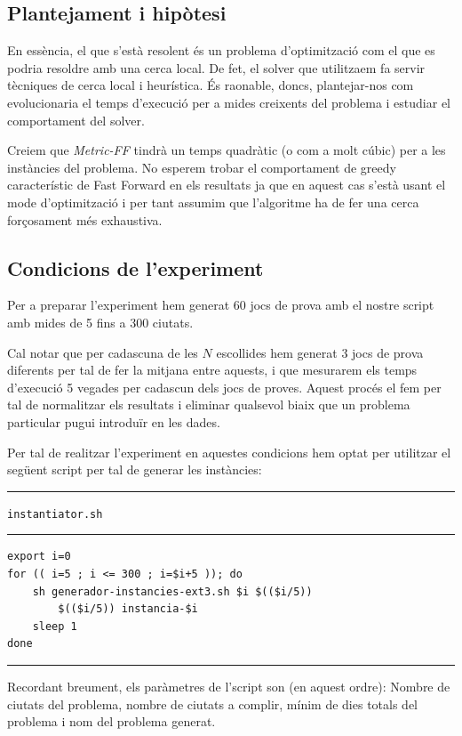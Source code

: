 \documentclass[11pt,a4paper]{article}
\begin{document}
\subsection{Plantejament i hipòtesi}

En essència, el que s'està resolent és un problema d'optimització com el que es podria resoldre amb una cerca local. De fet, el solver que utilitzaem fa servir tècniques de cerca local i heurística. És raonable, doncs, plantejar-nos com evolucionaria el temps d'execució per a mides creixents del problema i estudiar el comportament del solver. 

Creiem que \emph{Metric-FF} tindrà un temps quadràtic (o com a molt cúbic) per a les instàncies del problema. No esperem trobar el comportament de greedy característic de Fast Forward en els resultats ja que en aquest cas s'està usant el mode d'optimització i per tant assumim que l'algoritme ha de fer una cerca forçosament més exhaustiva.

\subsection{Condicions de l'experiment}

Per a preparar l'experiment hem generat 60 jocs de prova amb el nostre script amb mides de 5 fins a 300 ciutats. 

Cal notar que per cadascuna de les $N$ escollides hem generat 3 jocs de prova diferents per tal de fer la mitjana entre aquests, i que mesurarem els temps d'execució 5 vegades per cadascun dels jocs de proves. Aquest procés el fem per tal de normalitzar els resultats i eliminar qualsevol biaix que un problema particular pugui introduïr en les dades.

Per tal de realitzar l'experiment en aquestes condicions hem optat per utilitzar el següent script per tal de generar les instàncies:

\begin{samepage}
\medskip
\noindent
\rule{0.1\textwidth}{0.5mm}
\texttt{instantiator.sh}
\rule{0.65\textwidth}{0.5mm}
\begin{verbatim}
export i=0
for (( i=5 ; i <= 300 ; i=$i+5 )); do
    sh generador-instancies-ext3.sh $i $(($i/5))
        $(($i/5)) instancia-$i
    sleep 1
done
\end{verbatim}
\rule{\textwidth}{0.5mm}
\end{samepage}

Recordant breument, els paràmetres de l'script son (en aquest ordre): Nombre de ciutats del problema, nombre de ciutats a complir, mínim de dies totals del problema i nom del problema generat.
\end{document}
